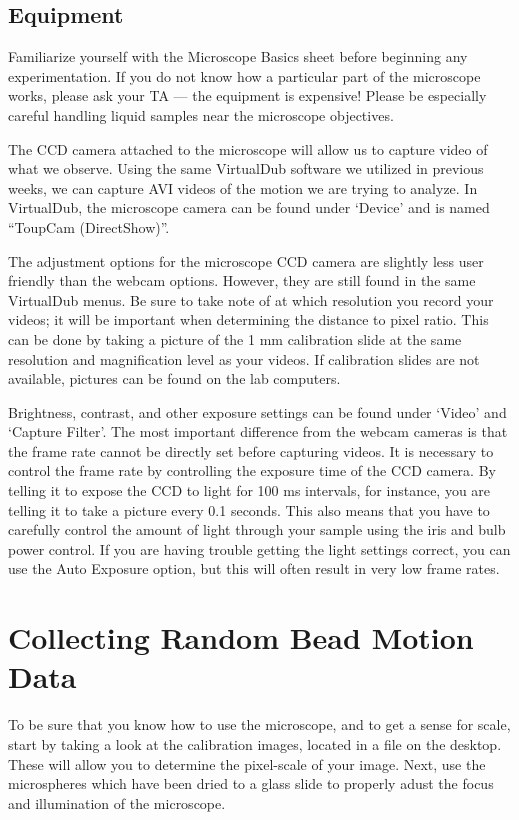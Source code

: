\subsection*{Equipment}
Familiarize yourself with the Microscope Basics sheet before beginning any experimentation. 
If you do not know how a particular part of the microscope works, please ask your TA — the equipment is expensive! 
Please be especially careful handling liquid samples near the microscope objectives. 
\par
The CCD camera attached to the microscope will allow us to capture video of what we observe. 
Using the same VirtualDub software we utilized in previous weeks, we can capture AVI videos of the motion we are trying to analyze. 
In VirtualDub, the microscope camera can be found under `Device' and is named ``ToupCam (DirectShow)''. 
\par  
The adjustment options for the microscope CCD camera are slightly less user friendly than the webcam options. 
However, they are still found in the same VirtualDub menus. 
Be sure to take note of at which resolution you record your videos; it will be important when determining the distance to pixel ratio. 
This can be done by taking a picture of the 1 mm calibration slide at the same resolution and magnification level as your videos. 
If calibration slides are not available, pictures can be found on the lab computers. 
\par 
Brightness, contrast, and other exposure settings can be found under `Video' and `Capture Filter'. 
The most important difference from the webcam cameras is that the frame rate cannot be directly set before capturing videos. 
It is necessary to control the frame rate by controlling the exposure time of the CCD camera. 
By telling it to expose the CCD to light for 100 ms intervals, for instance, you are telling it to take a picture every 0.1 seconds.
This also means that you have to carefully control the amount of light through your sample using the iris and bulb power control. 
If you are having trouble getting the light settings correct, you can use the Auto Exposure option, but this will often result in very low frame rates.

\section*{Collecting Random Bead Motion Data}
To be sure that you know how to use the microscope, and to get a sense for scale, start by taking a look at the calibration images, located in a file on the desktop. These will allow you to determine the pixel-scale of your image. Next, use the microspheres which have been dried to a glass slide to properly adust the focus and illumination of the microscope.
